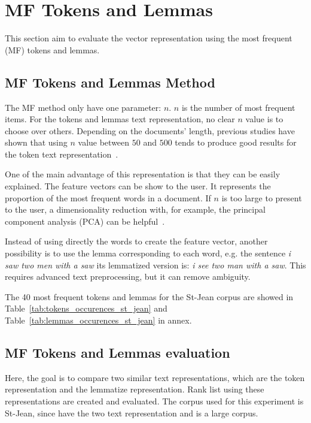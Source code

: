 \section{MF Tokens and Lemmas \label{sec:tokens_lemmas}}

This section aim to evaluate the vector representation using the most frequent (MF) tokens and lemmas.

\subsection{MF Tokens and Lemmas Method}

The MF method only have one parameter: $n$.
$n$ is the number of most frequent items.
For the tokens and lemmas text representation, no clear $n$ value is to choose over others.
Depending on the documents' length, previous studies have shown that using $n$ value between $50$ and $500$ tends to produce good results for the token text representation~\cite{savoy_text_representation}.

One of the main advantage of this representation is that they can be easily explained.
The feature vectors can be show to the user.
It represents the proportion of the most frequent words in a document.
If $n$ is too large to present to the user, a dimensionality reduction with, for example, the principal component analysis (PCA) can be helpful~\cite{savoy_stylo}.

Instead of using directly the words to create the feature vector, another possibility is to use the lemma corresponding to each word, e.g. the sentence \textit{i saw two men with a saw} its lemmatized version is: \textit{i see two man with a saw}.
This requires advanced text preprocessing, but it can remove ambiguity.

The 40 most frequent tokens and lemmas for the St-Jean corpus are showed in Table~\ref{tab:tokens_occurences_st_jean} and Table~\ref{tab:lemmas_occurences_st_jean} in annex.

\subsection{MF Tokens and Lemmas evaluation \label{sec:tokens_lemmas_eval}}

Here, the goal is to compare two similar text representations, which are the token representation and the lemmatize representation.
Rank list using these representations are created and evaluated.
The corpus used for this experiment is St-Jean, since have the two text representation and is a large corpus.


